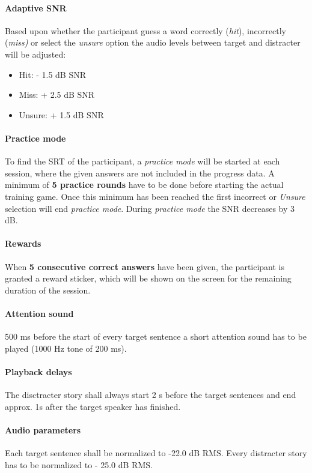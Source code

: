 \documentclass[a4paper,11pt]{article}%
\renewcommand{\\}{\vspace*{0.5\baselineskip} \newline}
\begin{document}
\paragraph{Adaptive SNR} Based upon whether the participant guess a word correctly (\textit{hit}), incorrectly (\textit{miss)} or select the \textit{unsure} option the audio levels between target and distracter will be adjusted:
\begin{itemize}
\item Hit: - 1.5 dB SNR
\item Miss: + 2.5 dB SNR
\item Unsure: + 1.5 dB SNR
\end{itemize}

\paragraph{Practice mode} To find the \ac{SRT} of the participant, a \textit{practice mode} will be started at each session, where the given answers are not included in the progress data. A minimum of \textbf{5 practice rounds} have to be done before starting the actual training game. Once this minimum has been reached the first incorrect or \textit{Unsure} selection will end \textit{practice mode}. During \textit{practice mode} the \ac{SNR} decreases by 3 dB.

\paragraph{Rewards} When \textbf{5 consecutive correct answers} have been given, the participant is granted a reward sticker, which will be shown on the screen for the remaining duration of the session.

\paragraph{Attention sound} 500 ms before the start of every target sentence a short attention sound has to be played (1000 Hz tone of 200 ms).

\paragraph{Playback delays} The disctracter story shall always start 2 s before the target sentences and end approx. 1s after the target speaker has finished.

\paragraph{Audio parameters} Each target sentence shall be normalized to -22.0 dB \acs{RMS}. Every distracter story has to be normalized to - 25.0 dB \acs{RMS}.
\end{document}
